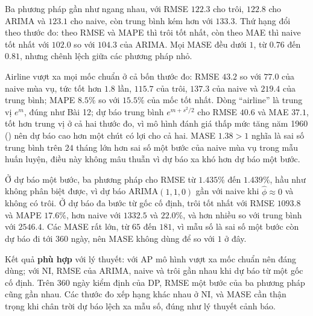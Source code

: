  Ba phương pháp gần như ngang nhau, với RMSE $122.3$ cho trôi, $122.8$ cho ARIMA và $123.1$ cho naive, còn trung bình kém hơn với $133.3$. Thứ hạng đổi theo thước đo: theo RMSE và MAPE thì trôi tốt nhất, còn theo MAE thì naive tốt nhất với $102.0$ so với $104.3$ của ARIMA. Mọi MASE đều dưới $1$, từ $0.76$ đến $0.81$, nhưng chênh lệch giữa các phương pháp nhỏ.

 Airline vượt xa mọi mốc chuẩn ở cả bốn thước đo: RMSE $43.2$ so với $77.0$ của naive mùa vụ, tức tốt hơn $1.8$ lần, $115.7$ của trôi, $137.3$ của naive và $219.4$ của trung bình; MAPE $8.5\%$ so với $15.5\%$ của mốc tốt nhất. Dòng ``airline'' là trung vị $e^{m}$, đúng như Bài 12; dự báo trung bình $e^{m+s^2/2}$ cho RMSE $40.6$ và MAE $37.1$, tốt hơn trung vị ở cả hai thước đo, vì mô hình đánh giá thấp mức tăng năm 1960 () nên dự báo cao hơn một chút có lợi cho cả hai. MASE $1.38>1$ nghĩa là sai số trung bình trên $24$ tháng lớn hơn sai số một bước của naive mùa vụ trong mẫu huấn luyện, điều này không mâu thuẫn vì dự báo xa khó hơn dự báo một bước.

 Ở dự báo một bước, ba phương pháp cho RMSE từ $1.435\%$ đến $1.439\%$, hầu như không phân biệt được, vì dự báo ARIMA$(1,1,0)$ gần với naive khi $\hat\phi\approx0$ và không có trôi. Ở dự báo đa bước từ gốc cố định, trôi tốt nhất với RMSE $1093.8$ và MAPE $17.6\%$, hơn naive với $1332.5$ và $22.0\%$, và hơn nhiều so với trung bình với $2546.4$. Các MASE rất lớn, từ $65$ đến $181$, vì mẫu số là sai số một bước còn dự báo đi tới $360$ ngày, nên MASE không dùng để so với $1$ ở đây.

 Kết quả \textbf{phù hợp} với lý thuyết: với AP mô hình vượt xa mốc chuẩn nên đáng dùng; với NI, RMSE của ARIMA, naive và trôi gần nhau khi dự báo từ một gốc cố định. Trên 360 ngày kiểm định của DP, RMSE một bước của ba phương pháp cũng gần nhau. Các thước đo xếp hạng khác nhau ở NI, và MASE cần thận trọng khi chân trời dự báo lệch xa mẫu số, đúng như lý thuyết cảnh báo.

